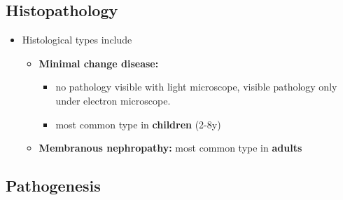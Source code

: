 \documentclass[
  12pt,
]{memoir}
\providecommand{\tightlist}{%
  \setlength{\itemsep}{0pt}\setlength{\parskip}{0pt}}
\begin{document}
\hypertarget{histopathology}{%
\subsection{Histopathology}\label{histopathology}}

\begin{itemize}
\tightlist
\item
  Histological types include

  \begin{itemize}
  \tightlist
  \item
    \textbf{Minimal change disease:}

    \begin{itemize}
    \tightlist
    \item
      no pathology visible with light microscope, visible pathology only
      under electron microscope.
    \item
      most common type in \textbf{children} (2-8y)
    \end{itemize}
  \item
    \textbf{Membranous nephropathy:} most common type in \textbf{adults}
  \end{itemize}
\end{itemize}

\pagebreak

\hypertarget{pathogenesis-1}{%
\subsection{Pathogenesis}\label{pathogenesis-1}}
\end{document}
